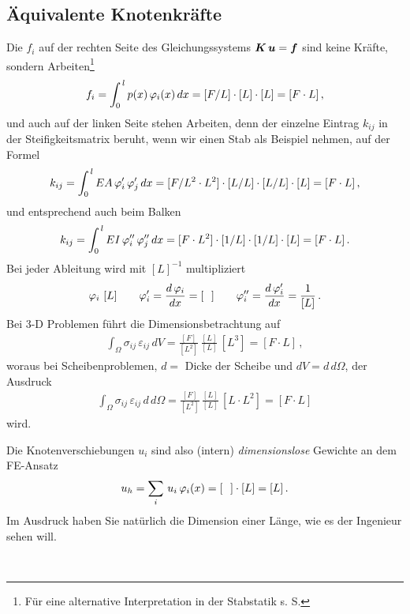 {\textcolor{sectionTitleBlue}{\section{\"{A}quivalente Knotenkr\"{a}fte}}}
Die $f_i $ auf der rechten Seite des Gleichungssystems $\mbox{\boldmath $K$}\,\mbox{\boldmath $u$} = \mbox{\boldmath $f$} $ sind keine Kr\"{a}fte, sondern Arbeiten\footnote{F\"{u}r eine alternative Interpretation in der Stabstatik s. S. \pageref{Dimensionsbetrachtung}}
\begin{align}
f_i = \int_0^{\,l} p(x)\,\varphi_i(x)\,dx = [F/L] \cdot [L] \cdot [L] = [F \cdot L]\,,
\end{align}
und auch auf der linken Seite stehen Arbeiten, denn der einzelne Eintrag $k_{ij}$ in der Steifigkeitsmatrix beruht, wenn wir einen Stab als Beispiel nehmen, auf der Formel
\begin{align}
k_{ij } = \int_0^{\,l} EA\,\varphi_i'\,\varphi_j'\,dx = [F/L^2 \cdot L^2] \cdot [L/L] \cdot [L/L] \cdot [L] = [F \cdot L]\,,
\end{align}
und entsprechend auch beim Balken
\begin{align}
k_{ij } = \int_0^{\,l} EI\,\varphi_i''\,\varphi_j''\,dx = [F \cdot L^2] \cdot [1/L] \cdot [1/L] \cdot [L] = [F \cdot L]\,.
\end{align}
Bei jeder Ableitung wird mit $[L]^{-1}$ multipliziert
\begin{align}
\varphi_i\,\,[L] \qquad \varphi_i' = \frac{d\,\varphi_i}{dx} = [\phantom{L}] \qquad \varphi_i'' = \frac{d\,\varphi_i'}{dx} = \frac{1}{[L]}\,.
\end{align}
Bei 3-D Problemen f\"{u}hrt die Dimensionsbetrachtung auf
\begin{align}
\int_{\Omega} \sigma_{ij}\,\varepsilon_{ij} \,dV = \frac{[F]}{[L^2]}\,\frac{[L]}{[L]} \,[L^3] = [F \cdot L]\,,
\end{align}
woraus bei Scheibenproblemen, $d = $ Dicke der Scheibe und $ dV = d\, d\Omega$, der Ausdruck
\begin{align}
\int_{\Omega} \sigma_{ij}\,\varepsilon_{ij}\, d \,d\Omega = \frac{[F]}{[L^2]}\,\frac{[L]}{[L]} \,[L \cdot L^2] = [F \cdot L]
\end{align}
wird.\\

\hspace*{-12pt}\colorbox{highlightBlue}{\parbox{0.98\textwidth}{Die Knotenverschiebungen $u_i$ sind also (intern) {\em dimensionslose\/} Gewichte an dem FE-Ansatz
\begin{align}
u_h = \sum_i\,u_i\,\varphi_i(x) = [\phantom{L}] \cdot [L] = [L]\,.
\end{align}
Im Ausdruck haben Sie nat\"{u}rlich die Dimension einer L\"{a}nge, wie es der Ingenieur sehen will.
}}\\

